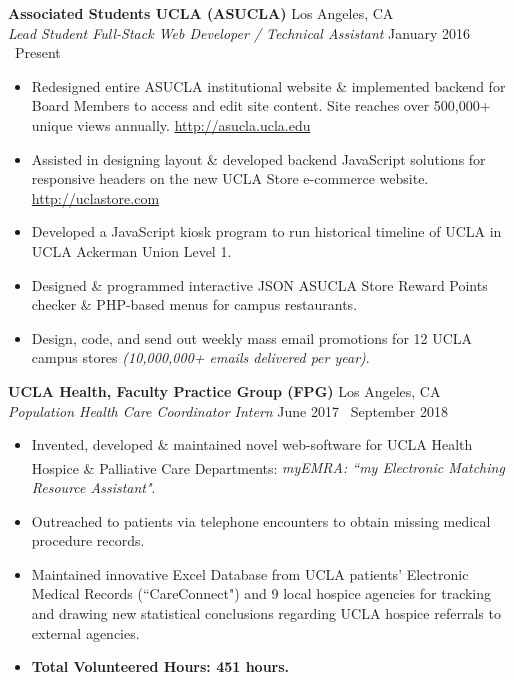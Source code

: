 \documentclass[margin]{res}
\begin{document}
\begin{resume}
		{\bf Associated Students UCLA (ASUCLA)} \hfill Los Angeles, CA \\
		{\it Lead Student Full-Stack Web Developer / Technical Assistant} \hfill January 2016 \textendash\ Present
		\begin{itemize} \itemsep -2pt
			\item Redesigned entire ASUCLA institutional website \& implemented backend for Board Members to access and edit site content. Site reaches over 500,000+ unique views annually. \textcolor{RoyalBlue}{\url{http://asucla.ucla.edu}}
			\item Assisted in designing layout \& developed backend JavaScript solutions for responsive headers on the new UCLA Store e-commerce website. \textcolor{RoyalBlue}{\url{http://uclastore.com}}
			\item Developed a JavaScript kiosk program to run historical timeline of UCLA in UCLA Ackerman Union Level 1.
			\item Designed \& programmed interactive JSON ASUCLA Store Reward Points checker \& PHP-based menus for campus restaurants.
			\item Design, code, and send out weekly mass email promotions for 12 UCLA campus stores {\it (10,000,000+ emails delivered per year)}.
		\end{itemize}
		
		{\bf UCLA Health, Faculty Practice Group (FPG)} \hfill Los Angeles, CA \\
		{\it Population Health Care Coordinator Intern} \hfill June 2017 \textendash\ September 2018
		\begin{itemize} \itemsep -2pt
			\item Invented, developed \& maintained novel web-software for UCLA Health Hospice \& Palliative Care Departments: {\it myEMRA\textsuperscript{\textregistered}: ``my Electronic Matching Resource Assistant"}.
			\item Outreached to patients via telephone encounters to obtain missing medical procedure records.
			\item Maintained innovative Excel Database from UCLA patients' Electronic Medical Records (``CareConnect") and 9 local hospice agencies for tracking and drawing new statistical conclusions regarding UCLA hospice referrals to external agencies.
			\item {\bf Total Volunteered Hours: 451 hours.}
		\end{itemize}
		

\end{resume}
\end{document}
